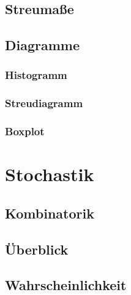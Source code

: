 \begin{multicols}{2}
\subsection{Streumaße}

\subsection{Diagramme}

\subsubsection{Histogramm}

\subsubsection{Streudiagramm}

\subsubsection{Boxplot}


\section{Stochastik}

\subsection{Kombinatorik}
\end{multicols}

\subsection*{Überblick}


\begin{multicols}{2}


\subsection{Wahrscheinlichkeit}


\end{multicols}


